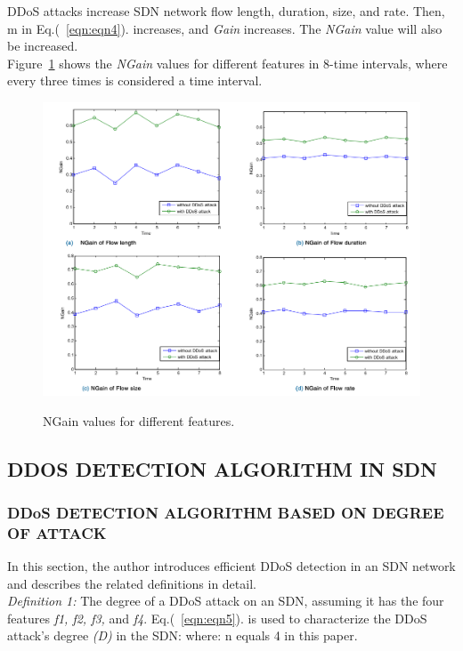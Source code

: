 \documentclass[12pt]{report}
\begin{document}
DDoS attacks increase SDN network flow length, duration, size, and rate. Then, m in Eq.(~\ref{eqn:eqn4}). increases, and \emph{Gain} increases. The \emph{NGain} value will also be increased. \\

Figure~\ref{fig:ngain} shows the \emph{NGain} values for different features in 8-time intervals, where every three times is considered a time interval. 

\begin{figure}[H]
    \centering
    \includegraphics[scale=0.4]{fig6.png}\\
    \caption{NGain values for different features.}
    \label{fig:ngain}
\end{figure}

\subsection{DDOS DETECTION ALGORITHM IN SDN}
\subsubsection{DDoS DETECTION ALGORITHM BASED ON DEGREE OF ATTACK}

In this section, the author introduces efficient DDoS detection in an SDN network and describes the related definitions in detail. \\ 

\emph{Definition 1:} The degree of a DDoS attack on an SDN, assuming it has the four features \emph{f1, f2, f3,} and \emph{f4}. Eq.(~\ref{eqn:eqn5}). is used to characterize the DDoS attack's degree \emph{(D)} in the SDN: where: n equals 4 in this paper.\\
\end{document}
